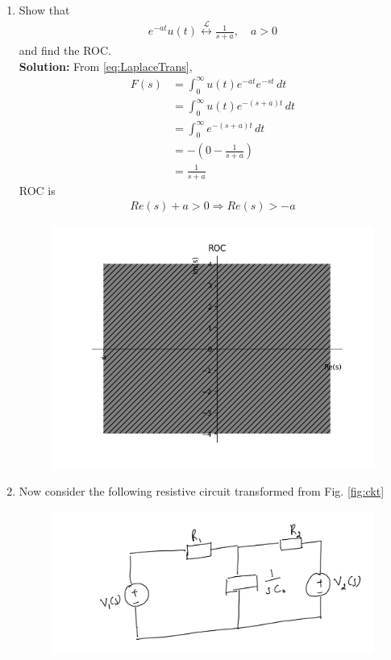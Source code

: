 \documentclass[journal,12pt,twocolumn]{IEEEtran}
\newcommand{\solution}{\noindent \textbf{Solution: }}
\providecommand{\brak}[1]{\ensuremath{\left(#1\right)}}
\providecommand{\system}[1]{\overset{\mathcal{#1}}{ \longleftrightarrow}}
\numberwithin{equation}{section}
\renewcommand\thesection{\arabic{section}}
\begin{document}
\begin{enumerate}[label=\arabic*.,ref=\thesection.\theenumi]
\begin{figure}[!ht]
			\caption{}
			\label{fig:roc1}
\end{figure}
	\item Show that 
		\begin{align}
			e^{-at}u(t) \system{L} \frac{1}{s+a}, \quad a > 0
		\end{align}
		and find the ROC.\\
		\solution From \ref{eq:LaplaceTrans},
		\begin{align}
		F(s)&=\int_{0}^{\infty} u(t)e^{-at}e^{-st} \,dt\\
		&=\int_{0}^{\infty} u(t)e^{-\brak{s+a}t} \,dt\\
		&=\int_{0}^{\infty} e^{-\brak{s+a}t} \,dt\\
		&=-\brak{0-\frac{1}{s+a}}\\
		&=\frac{1}{s+a}
		\end{align}
		ROC is
		\begin{align}
		Re(s)+a>0 \Rightarrow  Re(s)>-a
		\end{align}
		\begin{figure}[!ht]
			\centering
			\includegraphics[width=\columnwidth]{figs/2.5.png}
			\caption{}
			\label{fig:roc2}
\end{figure}
	\item Now consider the following resistive circuit transformed from 
			Fig. \ref{fig:ckt}
		\begin{figure}[!ht]
			\centering
			\includegraphics[width=\columnwidth]{figs/lap-ckt.jpg}

\end{figure}
\end{enumerate}
\end{document}
